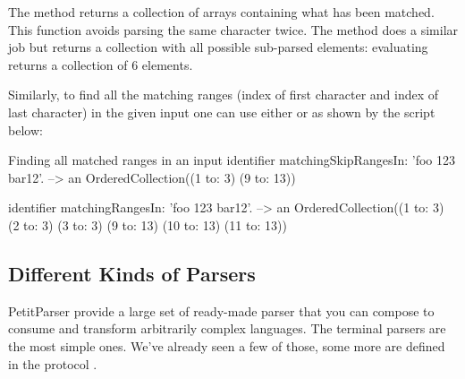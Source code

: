 \documentclass[a4paper,10pt,twoside]{book}
\begin{document}
The  method returns a collection of arrays
containing what has been matched. This function avoids parsing the
same character twice. The method  does a similar
job but returns a collection with all possible sub-parsed elements:
\eg{} evaluating  returns a
collection of 6 elements.

Similarly, to find all the matching ranges (index of first character
and index of last character) in the given input one can use either
 or  as
shown by the script below:

\begin{script}{Finding all matched ranges in an input}
identifier matchingSkipRangesIn: 'foo 123 bar12'.
 --> an OrderedCollection((1 to: 3) (9 to: 13))

identifier matchingRangesIn: 'foo 123 bar12'.
 --> an OrderedCollection((1 to: 3) (2 to: 3) (3 to: 3) (9 to: 13) (10 to: 13) (11 to: 13))
\end{script}

\subsection{Different Kinds of Parsers}

PetitParser provide a large set of ready-made parser that you can
compose to consume and transform arbitrarily complex languages. The
terminal parsers are the most simple ones. We've already seen a few of
those, some more are defined in the protocol .
\end{document}
